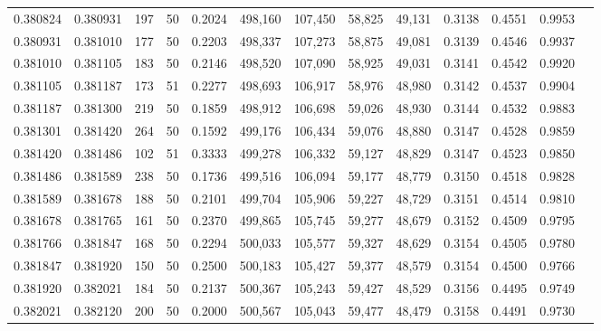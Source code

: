 \begin{tabular}{rrrrrrrrrrrrr}
0.380824 & 0.380931 &   197 &  50 &                                     0.2024 & 498,160 & 107,450 &  58,825 &  49,131 & 0.3138 & 0.4551 & 0.9953 \\
0.380931 & 0.381010 &   177 &  50 &                                     0.2203 & 498,337 & 107,273 &  58,875 &  49,081 & 0.3139 & 0.4546 & 0.9937 \\
0.381010 & 0.381105 &   183 &  50 &                                     0.2146 & 498,520 & 107,090 &  58,925 &  49,031 & 0.3141 & 0.4542 & 0.9920 \\
0.381105 & 0.381187 &   173 &  51 &                                     0.2277 & 498,693 & 106,917 &  58,976 &  48,980 & 0.3142 & 0.4537 & 0.9904 \\
0.381187 & 0.381300 &   219 &  50 &                                     0.1859 & 498,912 & 106,698 &  59,026 &  48,930 & 0.3144 & 0.4532 & 0.9883 \\
0.381301 & 0.381420 &   264 &  50 &                                     0.1592 & 499,176 & 106,434 &  59,076 &  48,880 & 0.3147 & 0.4528 & 0.9859 \\
0.381420 & 0.381486 &   102 &  51 &                                     0.3333 & 499,278 & 106,332 &  59,127 &  48,829 & 0.3147 & 0.4523 & 0.9850 \\
0.381486 & 0.381589 &   238 &  50 &                                     0.1736 & 499,516 & 106,094 &  59,177 &  48,779 & 0.3150 & 0.4518 & 0.9828 \\
0.381589 & 0.381678 &   188 &  50 &                                     0.2101 & 499,704 & 105,906 &  59,227 &  48,729 & 0.3151 & 0.4514 & 0.9810 \\
0.381678 & 0.381765 &   161 &  50 &                                     0.2370 & 499,865 & 105,745 &  59,277 &  48,679 & 0.3152 & 0.4509 & 0.9795 \\
0.381766 & 0.381847 &   168 &  50 &                                     0.2294 & 500,033 & 105,577 &  59,327 &  48,629 & 0.3154 & 0.4505 & 0.9780 \\
0.381847 & 0.381920 &   150 &  50 &                                     0.2500 & 500,183 & 105,427 &  59,377 &  48,579 & 0.3154 & 0.4500 & 0.9766 \\
0.381920 & 0.382021 &   184 &  50 &                                     0.2137 & 500,367 & 105,243 &  59,427 &  48,529 & 0.3156 & 0.4495 & 0.9749 \\
0.382021 & 0.382120 &   200 &  50 &                                     0.2000 & 500,567 & 105,043 &  59,477 &  48,479 & 0.3158 & 0.4491 & 0.9730 \\

\end{tabular}
